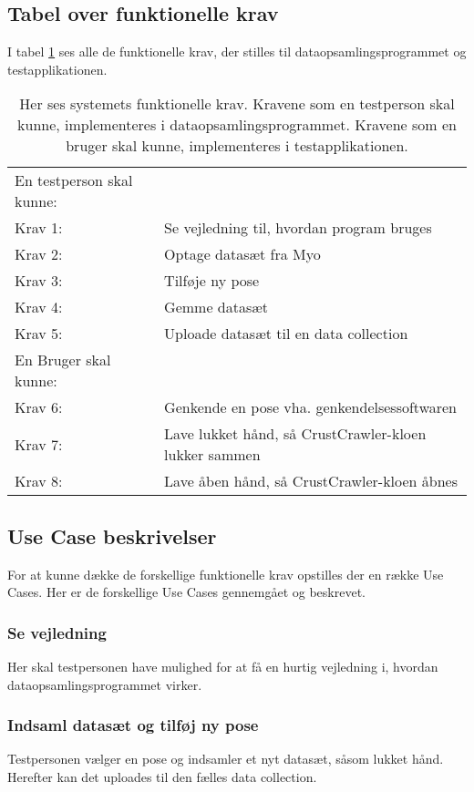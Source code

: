 \subsection*{Tabel over funktionelle krav}
I tabel \ref{tab:funktionellekrav} ses alle de funktionelle krav, der stilles til dataopsamlingsprogrammet og testapplikationen.
\bgroup
\def\arraystretch{1.8}
\begin{center}
	\begin{table}
		\begin{tabular}{lp{225pt}}
			\rowcolor{grey} En testperson skal kunne: &\\
			Krav 1:& Se vejledning til, hvordan program bruges\\
			Krav 2:& Optage datasæt fra Myo\\
			Krav 3:& Tilføje ny pose\\
			Krav 4:& Gemme datasæt\\
			Krav 5:& Uploade datasæt til en data collection\\
			\rowcolor{grey}En Bruger skal kunne: &\\
			Krav 6:& Genkende en pose vha. genkendelsessoftwaren\\
			Krav 7:& Lave lukket hånd, så CrustCrawler-kloen lukker sammen\\
			Krav 8:& Lave åben hånd, så CrustCrawler-kloen åbnes
		\end{tabular}
		\caption{Her ses systemets funktionelle krav. Kravene som en testperson skal kunne, implementeres i dataopsamlingsprogrammet. Kravene som en bruger skal kunne, implementeres i testapplikationen.}
		\label{tab:funktionellekrav}
	\end{table}	
\end{center}
\egroup

\subsection*{Use Case beskrivelser}
For at kunne dække de forskellige funktionelle krav opstilles der en række Use Cases. Her er de forskellige Use Cases gennemgået og beskrevet.

\subsubsection{Se vejledning}
Her skal testpersonen have mulighed for at få en hurtig vejledning i, hvordan dataopsamlingsprogrammet virker.

\subsubsection{Indsaml datasæt og tilføj ny pose}
Testpersonen vælger en pose og indsamler et nyt datasæt, såsom lukket hånd. Herefter kan det uploades til den fælles data collection.
